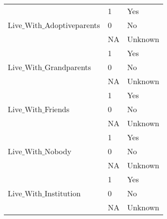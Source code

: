 \begin{table}[H]
\begin{tabular}{l | l | l}
            \multirow{3}{*}{Live$\_$With$\_$Adoptiveparents}
            						& \multicolumn{1}{l}{1}     & \multicolumn{1}{l}{Yes}     \\\cline{2-3}
                                    & \multicolumn{1}{l}{0}     & \multicolumn{1}{l}{No} \\\cline{2-3}
                                    & \multicolumn{1}{l}{NA}    & \multicolumn{1}{l}{Unknown}   \\\hline
                                    
            \multirow{3}{*}{Live$\_$With$\_$Grandparents}
            						& \multicolumn{1}{l}{1}     & \multicolumn{1}{l}{Yes}     \\\cline{2-3}
                                    & \multicolumn{1}{l}{0}     & \multicolumn{1}{l}{No} \\\cline{2-3}
                                    & \multicolumn{1}{l}{NA}    & \multicolumn{1}{l}{Unknown}   \\\hline
                                    
            \multirow{3}{*}{Live$\_$With$\_$Friends}
            						& \multicolumn{1}{l}{1}     & \multicolumn{1}{l}{Yes}     \\\cline{2-3}
                                    & \multicolumn{1}{l}{0}     & \multicolumn{1}{l}{No} \\\cline{2-3}
                                    & \multicolumn{1}{l}{NA}    & \multicolumn{1}{l}{Unknown}   \\\hline
                                    
            \multirow{3}{*}{Live$\_$With$\_$Nobody}
            						& \multicolumn{1}{l}{1}     & \multicolumn{1}{l}{Yes}     \\\cline{2-3}
                                    & \multicolumn{1}{l}{0}     & \multicolumn{1}{l}{No} \\\cline{2-3}
                                    & \multicolumn{1}{l}{NA}    & \multicolumn{1}{l}{Unknown}   \\\hline
                                    
            \multirow{3}{*}{Live$\_$With$\_$Institution}
            						& \multicolumn{1}{l}{1}     & \multicolumn{1}{l}{Yes}     \\\cline{2-3}
                                    & \multicolumn{1}{l}{0}     & \multicolumn{1}{l}{No} \\\cline{2-3}
                                    & \multicolumn{1}{l}{NA}    & \multicolumn{1}{l}{Unknown}   \\\hline
                                    

\end{tabular}
\end{table}
